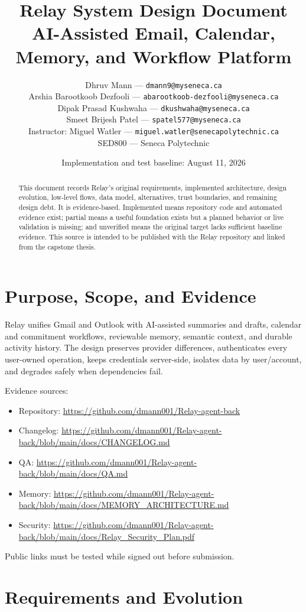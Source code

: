 \documentclass[11pt]{article}
\title{\textbf{Relay System Design Document}\\
\large AI-Assisted Email, Calendar, Memory, and Workflow Platform}
\author{Dhruv Mann --- \texttt{dmann9@myseneca.ca}\\
Arshia Barootkoob Dezfooli --- \texttt{abarootkoob-dezfooli@myseneca.ca}\\
Dipak Prasad Kushwaha --- \texttt{dkushwaha@myseneca.ca}\\
Smeet Brijesh Patel --- \texttt{spatel577@myseneca.ca}\\[0.6em]
Instructor: Miguel Watler --- \texttt{miguel.watler@senecapolytechnic.ca}\\
SED800 --- Seneca Polytechnic}
\date{Implementation and test baseline: August 11, 2026}
\begin{document}
\maketitle

\begin{abstract}
This document records Relay's original requirements, implemented architecture,
design evolution, low-level flows, data model, alternatives, trust boundaries,
and remaining design debt. It is evidence-based. Implemented means repository
code and automated evidence exist; partial means a useful foundation exists but
a planned behavior or live validation is missing; and unverified means the
original target lacks sufficient baseline evidence. This source is intended to
be published with the Relay repository and linked from the capstone thesis.
\end{abstract}

\tableofcontents
\newpage

\section{Purpose, Scope, and Evidence}

Relay unifies Gmail and Outlook with AI-assisted summaries and drafts,
calendar and commitment workflows, reviewable memory, semantic context, and
durable activity history. The design preserves provider differences,
authenticates every user-owned operation, keeps credentials server-side,
isolates data by user/account, and degrades safely when dependencies fail.

Evidence sources:
\begin{itemize}
  \item Repository: \url{https://github.com/dmann001/Relay-agent-back}
  \item Changelog: \url{https://github.com/dmann001/Relay-agent-back/blob/main/docs/CHANGELOG.md}
  \item QA: \url{https://github.com/dmann001/Relay-agent-back/blob/main/docs/QA.md}
  \item Memory: \url{https://github.com/dmann001/Relay-agent-back/blob/main/docs/MEMORY_ARCHITECTURE.md}
  \item Security: \url{https://github.com/dmann001/Relay-agent-back/blob/main/docs/Relay_Security_Plan.pdf}
\end{itemize}
Public links must be tested while signed out before submission.

\section{Requirements and Evolution}
\end{document}
